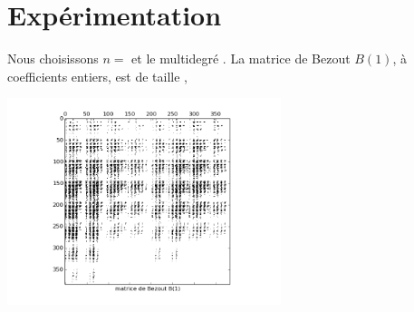 \documentclass{standalone}
\begin{document}
  \section{Expérimentation}
  Nous choisissons $n=

$ et le multidegré $

$. La matrice de Bezout $B(1)$, à coefficients entiers, est de taille ,
   \begin{center}
  \includegraphics[width=8cm]{../png/bez.png}
  \end{center}
\end{document}

